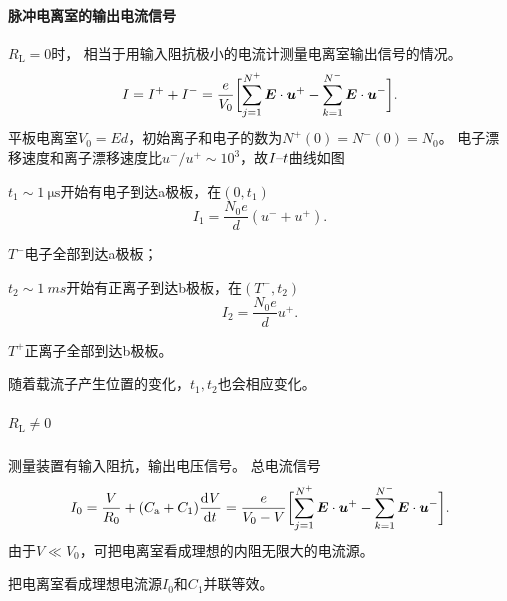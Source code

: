 \paragraph{脉冲电离室的输出电流信号}$R_{\mathrm{L}} = 0$时，
相当于用输入阻抗极小的电流计测量电离室输出信号的情况。%
\begin{equation}\label{eq:nrd-ion-chamber-current}
	I = I^+ + I^- = \frac e{V_0}\biggb{\sum_{j=1}^{N^+}\bm E \cdot \bm u^+ - \sum_{k=1}^{N^-}\bm E \cdot \bm u^-}.
\end{equation}
平板电离室$V_0 = Ed$，初始离子和电子的数为$N^+(0) = N^-(0) = N_0$。
电子漂移速度和离子漂移速度比$u^-/u^+ \sim 10^3$，故$I\vs t$曲线如图
\begin{notecaptionblock}
\end{notecaptionblock}
\begin{compactenum}
	\item $t_1 \sim \qty{1}{\micro\second}$开始有电子到达a极板，在$(0,t_1)$
	\[
		I_1 = \frac{N_0e}d(u^- + u^+).
	\]
	\item $T^-$电子全部到达a极板；
	\item $t_2 \sim \qty{1}{ms}$开始有正离子到达b极板，在$(T^-,t_2)$
	\[
		I_2 = \frac{N_0e}du^+.
	\]
	\item $T^+$正离子全部到达b极板。
\end{compactenum}
随着载流子产生位置的变化，$t_1,t_2$也会相应变化。
\subparagraph{$R_{\mathrm{L}} \neq 0$}
测量装置有输入阻抗，输出电压信号。
总电流信号
\[
	I_0 = \frac V{R_0} + (C_{\mathrm{a}} + C_1)\dv Vt = \frac e{V_0 - V}\biggb{\sum_{j=1}^{N^+}\bm E \cdot \bm u^+ - \sum_{k=1}^{N^-}\bm E \cdot \bm u^-}.
\]
由于$V \ll V_0$，可把电离室看成理想的内阻无限大的电流源。

把电离室看成理想电流源$I_0$和$C_1$并联等效。
\begin{notecaptionblock}
\end{notecaptionblock}

